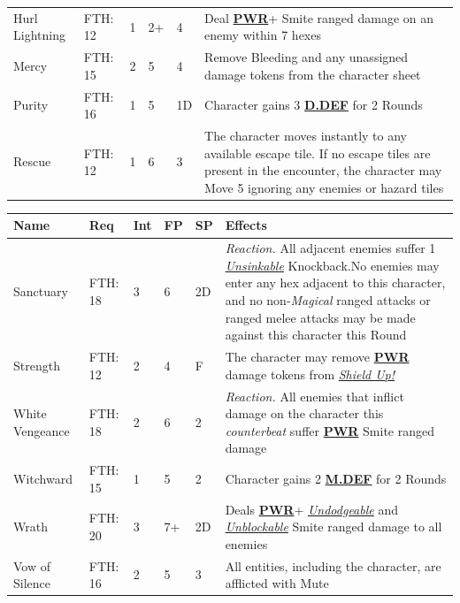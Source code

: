 \documentclass[12pt]{article}
\newcommand{\refto}[1]{\hyperlink{#1}{\textbf{#1}}}
\newcommand{\reftoit}[1]{\hyperlink{#1}{\emph{#1}}}
\begin{document}
\begin{center}
\begin{tabularx}{\textwidth}{p{}p{}p{}p{}p{}p{}}
Hurl Lightning & FTH: 12 & 1 & 2+ & 4 & Deal \refto{PWR}+ Smite ranged damage on an enemy within 7 hexes \\
Mercy & FTH: 15 & 2 & 5 & 4 & Remove Bleeding and any unassigned damage tokens from the character sheet \\
Purity & FTH: 16 & 1 & 5 & 1D & Character gains 3 \refto{D.DEF} for 2 Rounds \\
Rescue & FTH: 12 & 1 & 6 & 3 & The character moves instantly to any available escape tile. If no escape tiles are present in the encounter, the character may Move 5 ignoring any enemies or hazard tiles \\
\hline
\end{tabularx}
\end{center}

\pagebreak

\begin{center}
\begin{tabularx}{\textwidth}{p{}p{}p{}p{}p{}p{}}
\hline
\textbf{Name} & \textbf{Req} & \textbf{Int} & \textbf{FP} & \textbf{SP} & \textbf{Effects} \\
\hline
Sanctuary & FTH: 18 & 3 & 6 & 2D & \emph{Reaction.} All adjacent enemies suffer 1 \reftoit{Unsinkable} Knockback.\newline No enemies may enter any hex adjacent to this character, and no non-\emph{Magical} ranged attacks or ranged melee attacks may be made against this character this Round \\
Strength & FTH: 12 & 2 & 4 & F & The character may remove \refto{PWR} damage tokens from \reftoit{Shield Up!} \\
White Vengeance & FTH: 18 & 2 & 6 & 2 & \emph{Reaction.} All enemies that inflict damage on the character this \emph{counterbeat} suffer \refto{PWR} Smite ranged damage\\
Witchward & FTH: 15 & 1 & 5 & 2 & Character gains 2 \refto{M.DEF} for 2 Rounds\\
Wrath & FTH: 20 & 3 & 7+ & 2D & Deals \refto{PWR}+ \reftoit{Undodgeable} and \reftoit{Unblockable} Smite ranged damage to all enemies \\
Vow of Silence & FTH: 16 & 2 & 5 & 3 & All entities, including the character, are afflicted with Mute\\
\hline
\end{tabularx}
\end{center}

\pagebreak
\end{document}

